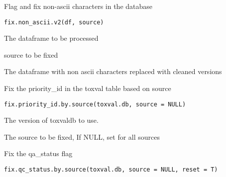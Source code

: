 \documentclass[letterpaper]{book}
\begin{document}
%
\begin{Description}\relax
Flag and fix non-ascii characters in the database
\end{Description}
%
\begin{Usage}
\begin{verbatim}
fix.non_ascii.v2(df, source)
\end{verbatim}
\end{Usage}
%
\begin{Arguments}
\begin{ldescription}
\item[\code{df}] The dataframe to be processed

\item[\code{The}] source to be fixed
\end{ldescription}
\end{Arguments}
%
\begin{Value}
The dataframe with non ascii characters replaced with cleaned versions
\end{Value}
%
\begin{Description}\relax
Fix the priority\_id in the toxval table based on source
\end{Description}
%
\begin{Usage}
\begin{verbatim}
fix.priority_id.by.source(toxval.db, source = NULL)
\end{verbatim}
\end{Usage}
%
\begin{Arguments}
\begin{ldescription}
\item[\code{toxval.db}] The version of toxvaldb to use.

\item[\code{source}] The source to be fixed, If NULL, set for all sources
\end{ldescription}
\end{Arguments}
%
\begin{Description}\relax
Fix the qa\_status flag
\end{Description}
%
\begin{Usage}
\begin{verbatim}
fix.qc_status.by.source(toxval.db, source = NULL, reset = T)
\end{verbatim}
\end{Usage}
\end{document}
